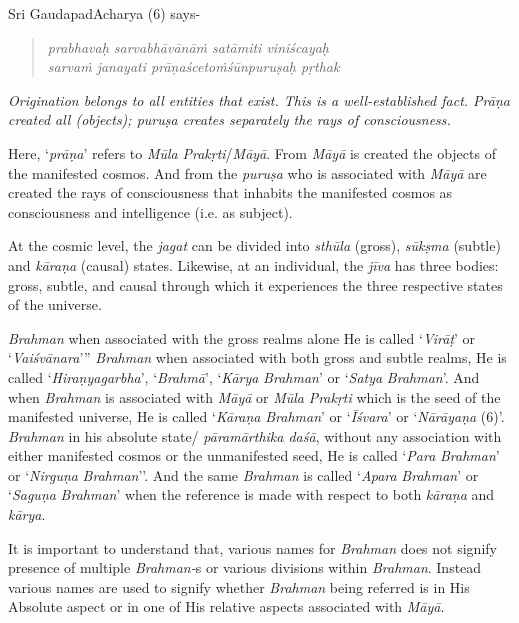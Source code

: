 Sri GaudapadAcharya (6) says-
\vskip -10pt

\begin{verse}
\emph{prabhavaḥ sarvabhāvānāṁ satāmiti viniścayaḥ }\\
\emph{sarvaṁ janayati prāṇaścetoṁśūnpuruṣaḥ pṛthak }
\end{verse}
\vskip -10pt

\emph{Origination belongs to all entities that exist. This is a well-established fact. Prāṇa created all (objects); puruṣa creates separately the rays of consciousness.}

Here, `\emph{prāṇa}' refers to \emph{Mūla} \emph{Prakṛti}/\emph{Māyā}. From \emph{Māyā} is created the objects of the manifested cosmos. And from the \emph{puruṣa} who is associated with \emph{Māyā} are created the rays of consciousness that inhabits the manifested cosmos as consciousness and intelligence (i.e. as subject).

At the cosmic level, the \emph{jagat} can be divided into \emph{sthūla} (gross), \emph{sūkṣma} (subtle) and \emph{kāraṇa} (causal) states. Likewise, at an individual, the \emph{jīva} has three bodies: gross, subtle, and causal through which it experiences the three respective states of the universe.

\emph{Brahman} when associated with the gross realms alone He is called `\emph{Virāṭ}' or `\emph{Vaiśvānara}''' \emph{Brahman} when associated with both gross and subtle realms, He is called `\emph{Hiraṇyagarbha}', `\emph{Brahmā}', `\emph{Kārya} \emph{Brahman}' or `\emph{Satya} \emph{Brahman}'. And when \emph{Brahman} is associated with \emph{Māyā} or \emph{Mūla} \emph{Prakṛti} which is the seed of the manifested universe, He is called `\emph{Kāraṇa} \emph{Brahman}' or `\emph{Īśvara}' or `\emph{Nārāyaṇa} (6)'. \emph{Brahman} in his absolute state/ \emph{pāramārthika daśā}, without any association with either manifested cosmos or the unmanifested seed, He is called `\emph{Para} \emph{Brahman}' or `\emph{Nirguṇa} \emph{Brahman}''. And the same \emph{Brahman} is called `\emph{Apara} \emph{Brahman}' or `\emph{Saguṇa} \emph{Brahman}' when the reference is made with respect to both \emph{kāraṇa} and \emph{kārya}.

It is important to understand that, various names for \emph{Brahman} does not signify presence of multiple \emph{Brahman-}s or various divisions within \emph{Brahman}. Instead various names are used to signify whether \emph{Brahman} being referred is in His Absolute aspect or in one of His relative aspects associated with \emph{Māyā}.

